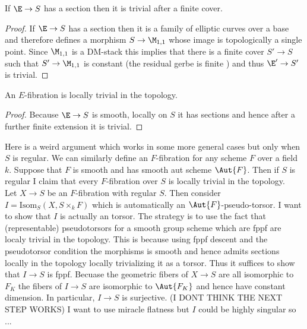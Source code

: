 \documentclass[12pt]{article}
\begin{document}
\begin{lemma}
If $\E \to S$ has a section then it is trivial after a finite \etale cover.
\end{lemma}

\begin{proof}
If $\E \to S$ has a section then it is a family of elliptic curves over a base and therefore defines a morphism $S \to \M_{1,1}$ whose image is topologically a single point. Since $\M_{1,1}$ is a DM-stack this implies that there is a finite \etale cover $S' \to S$ such that $S' \to \M_{1,1}$ is constant (the residual gerbe is finite \etale) and thus $\E' \to S'$ is trivial. 
\end{proof}

\begin{prop}
An $E$-fibration is locally trivial in the \etale topology.
\end{prop}

\begin{proof}
Because $\E \to S$ is smooth, \etale locally on $S$ it has sections and hence after a further finite \etale extension it is trivial. 
\end{proof}


\begin{rmk}
Here is a weird argument which works in some more general cases but only when $S$ is regular. We can similarly define an $F$-fibration for any scheme $F$ over a field $k$. Suppose that $F$ is smooth and has smooth aut scheme $\Aut{F}$. Then if $S$ is regular I claim that every $F$-fibration over $S$ is locally trivial in the \etale topology.
\bigskip\\
Let $X \to S$ be an $F$-fibration with regular $S$. Then consider $I = \mathrm{Isom}_S(X, S \times_k F)$ which is automatically an $\Aut{F}$-pseudo-torsor. I want to show that $I$ is actually an \etale torsor. The strategy is to use the fact that (representable) pseudotorsors for a smooth group scheme which are fppf are localy trivial in the \etale topology. This is because using fppf descent and the pseudotorsor condition the morphisms is smooth and hence admits sections locally in the \etale topology locally trivializing it as a torsor. Thus it suffices to show that $I \to S$ is fppf. Becuase the geometric fibers of $X \to S$ are all isomorphic to $F_K$ the fibers of $I \to S$ are isomorphic to $\Aut{F_K}$ and hence have constant dimension. In particular, $I \to S$ is surjective. (I DONT THINK THE NEXT STEP WORKS) I want to use miracle flatness but $I$ could be highly singular so ...
\end{rmk}
\end{document}
